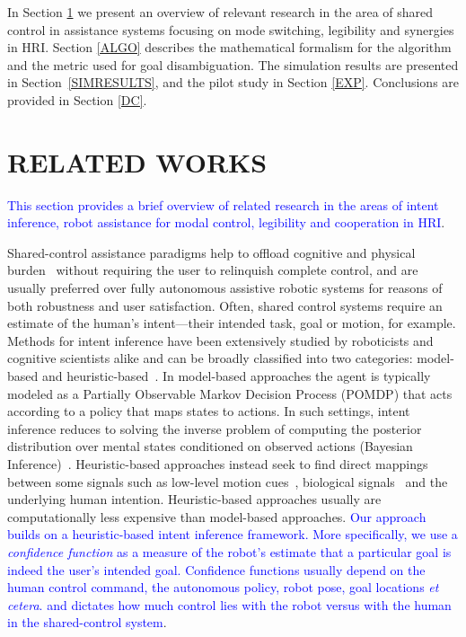\documentclass[conference]{IEEEtran}
\begin{document}
In Section \ref{RW} we present an overview of relevant research in the area of shared control in assistance systems focusing on mode switching, legibility and synergies in HRI. Section \ref{ALGO} describes the mathematical formalism for the algorithm and the metric used for goal disambiguation. The simulation results are presented in Section~\ref{SIMRESULTS}, and the pilot study in Section \ref{EXP}. Conclusions are provided in Section \ref{DC}.

\section{RELATED WORKS}\label{RW} 

\textcolor{blue}{This section provides a brief overview of related research in the areas of intent inference, robot assistance for modal control, legibility and cooperation in HRI}.

Shared-control assistance paradigms help to offload cognitive and physical burden~\cite{volosyak2005rehabilitation} without requiring the user to relinquish complete control, and are usually preferred over fully autonomous assistive robotic systems for reasons of both robustness and user satisfaction. Often, shared control systems require an estimate of the human's intent---their intended task, goal or motion, for example. Methods for intent inference have been extensively studied by roboticists and cognitive scientists alike and can be broadly classified into two categories: model-based and heuristic-based~\cite{baker2017rational}. In model-based approaches the agent is typically modeled as a Partially Observable Markov Decision Process (POMDP) that acts according to a policy that maps states to actions. In such settings, intent inference reduces to solving the inverse problem of computing the posterior distribution over mental states conditioned on observed actions (Bayesian Inference)~\cite{baker2007goal,baker2009action}. Heuristic-based approaches instead seek to find direct mappings between some signals such as low-level motion cues~\cite{barrett2005accurate}, biological signals~\cite{donoghue2002connecting} and the underlying human intention. Heuristic-based approaches usually are computationally less expensive than model-based approaches. \textcolor{blue}{Our approach builds on a heuristic-based intent inference framework. More specifically, we use a \textit{confidence function} as a measure of the robot's estimate that a particular goal is indeed the user's intended goal. Confidence functions usually depend on the human control command, the autonomous policy, robot pose, goal locations \textit{et cetera}. and dictates how much control lies with the robot versus with the human in the shared-control system}. 
\end{document}
